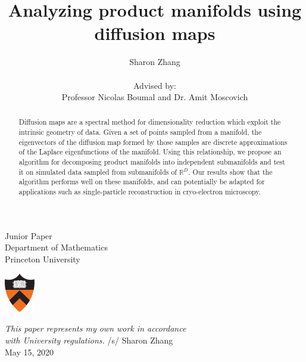 \documentclass{article}
\title{\textbf{Analyzing product manifolds using \\ diffusion maps}}
\author{Sharon Zhang \\ \vspace{1.0mm} \\ Advised by: \\ Professor Nicolas Boumal and Dr. Amit Moscovich}
\date{}
\numberwithin{equation}{section}
\theoremstyle{definition}
\begin{document}
\begin{titlepage}
    \clearpage\maketitle
    \thispagestyle{empty}
   \begin{center}
      
        Junior Paper\\
        Department of Mathematics\\
       Princeton University
       
       \vspace{0.5cm}
      \includegraphics[width=0.1\textwidth]{images/university.png}
        \vspace{0.35cm}
       
       \textit{This paper represents my own work in accordance \\ with University regulations.}
       /s/ Sharon Zhang \\
       
       \vspace{0.35cm}
         May 15, 2020
       
        \vfill

        \begin{abstract}
        Diffusion maps are a spectral method for dimensionality reduction which exploit the intrinsic geometry of data. Given a set of points sampled from a manifold, the eigenvectors of the diffusion map formed by those samples are discrete approximations of the Laplace eigenfunctions of the manifold. Using this relationship, we propose an algorithm for decomposing product manifolds into independent submanifolds and test it on simulated data sampled from submanifolds of $\mathbb{R}^D$. Our results show that the algorithm performs well on these manifolds, and can potentially be adapted for applications such as single-particle reconstruction in cryo-electron microscopy.
        \end{abstract}
   \end{center}
\end{titlepage}

\tableofcontents
\newpage
\end{document}
